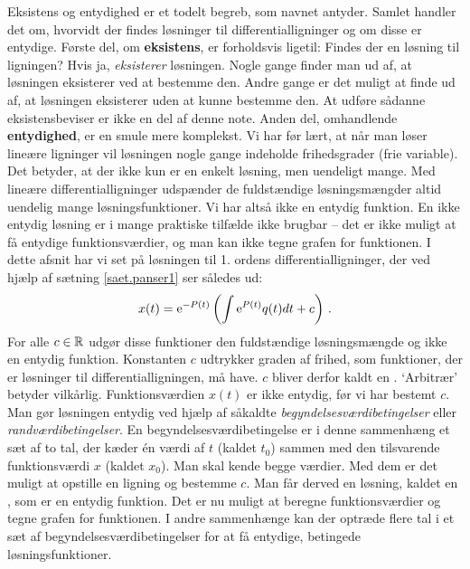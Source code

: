 \begin{explain} \label{hvad.eksent21}
Eksistens og entydighed er et todelt begreb, som navnet antyder. Samlet handler det om, hvorvidt der findes løsninger til differentialligninger og om disse er entydige. \bs
Første del, om \textbf{eksistens}, er forholdsvis ligetil: Findes der en løsning til ligningen? Hvis ja, \textit{eksisterer} løsningen. Nogle gange finder man ud af, at løsningen eksisterer ved at bestemme den. Andre gange er det muligt at finde ud af, at løsningen eksisterer uden at kunne bestemme den. At udføre sådanne eksistensbeviser er ikke en del af denne note. \bs
Anden del, omhandlende \textbf{entydighed}, er en smule mere komplekst. Vi har før lært, at når man løser lineære ligninger vil løsningen nogle gange indeholde frihedsgrader (frie variable). Det betyder, at der ikke kun er en enkelt løsning, men uendeligt mange. Med lineære differentialligninger udspænder de fuldstændige løsningsmængder altid uendelig mange løsningsfunktioner. Vi har altså ikke en entydig funktion. \bs
En ikke entydig løsning er i mange praktiske tilfælde ikke brugbar -- det er ikke muligt at få entydige funktionsværdier, og man kan ikke tegne grafen for funktionen. \bs
I dette afsnit har vi set på løsningen til 1. ordens differentialligninger, der ved hjælp af sætning \ref{saet.panser1} ser således ud:
\begin{equation}
x(t) = \mathrm{e}^{-P(t)} \left( \int \mathrm{e}^{P(t)}q(t)dt + c \right) \,.
\end{equation}
For alle $ c \in \mathbb{R} $ udgør disse funktioner den fuldstændige løsningsmængde og ikke en entydig funktion. Konstanten $ c $ udtrykker graden af frihed, som funktioner, der er løsninger til differentialligningen, må have. $ c $ bliver derfor kaldt en . `Arbitrær' betyder vilkårlig. Funktionsværdien $ x(t) $ er ikke entydig, før vi har bestemt $ c $. \bs
Man gør løsningen entydig ved hjælp af såkaldte \textit{begyndelsesværdibetingelser} eller \textit{randværdibetingelser}. En begyndelsesværdibetingelse er i denne sammenhæng et sæt af to tal, der kæder én værdi af $ t $ (kaldet $ t_0 $) sammen med den tilsvarende funktionsværdi $ x $ (kaldet $ x_0 $). Man skal kende begge værdier. Med dem er det muligt at opstille en ligning og bestemme $ c $. Man får derved en løsning, kaldet en , som er en entydig funktion. Det er nu muligt at beregne funktionsværdier og tegne grafen for funktionen. \bs
I andre sammenhænge kan der optræde flere tal i et sæt af begyndelsesværdibetingelser for at få entydige, betingede løsningsfunktioner.
\end{explain}

